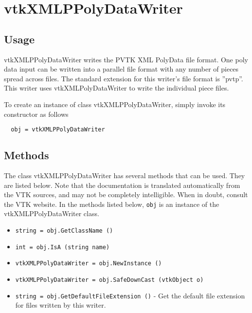 \section{vtkXMLPPolyDataWriter}

\subsection{Usage}

 vtkXMLPPolyDataWriter writes the PVTK XML PolyData file format.
 One poly data input can be written into a parallel file format with
 any number of pieces spread across files.  The standard extension
 for this writer's file format is ''pvtp''.  This writer uses
 vtkXMLPolyDataWriter to write the individual piece files.

To create an instance of class vtkXMLPPolyDataWriter, simply
invoke its constructor as follows
\begin{verbatim}
  obj = vtkXMLPPolyDataWriter
\end{verbatim}
\subsection{Methods}

The class vtkXMLPPolyDataWriter has several methods that can be used.
  They are listed below.
Note that the documentation is translated automatically from the VTK sources,
and may not be completely intelligible.  When in doubt, consult the VTK website.
In the methods listed below, \verb|obj| is an instance of the vtkXMLPPolyDataWriter class.
\begin{itemize}
\item  \verb|string = obj.GetClassName ()|

\item  \verb|int = obj.IsA (string name)|

\item  \verb|vtkXMLPPolyDataWriter = obj.NewInstance ()|

\item  \verb|vtkXMLPPolyDataWriter = obj.SafeDownCast (vtkObject o)|

\item  \verb|string = obj.GetDefaultFileExtension ()| -  Get the default file extension for files written by this writer.

\end{itemize}
